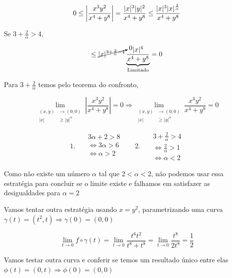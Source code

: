 \documentclass[
  letterpaper,
  DIV=11,
  numbers=noendperiod]{scrreprt}
\begin{document}
\[
0 \leq \left\lvert\frac{x^3y^2}{x^4+y^8} \right\rvert=
\frac{\lvert x \rvert^3 \lvert y \rvert^2}{x^4+y^8} \leq
\frac{\lvert x \rvert^{3} \lvert x \rvert^{\frac{2}{\alpha}}}{x^4+y^8} \\
\]

Se \(3 + \frac{2}{\alpha} > 4\),

\[
\leq \cancelto{0}{\lvert x \rvert^{3+\frac{2}{\alpha}-4}}
\underbrace{\frac{\lvert x \rvert^{4}}{x^4+y^8}}_{\text{Limitado}} = 0
\]

Para \(3 + \frac{2}{\alpha}\) temos pelo teorema do confronto,

\[
\lim_{\begin{aligned}(x,y)&\rightarrow (0,0) \\ 
\lvert x \rvert & \geq \lvert y \rvert^{\alpha} \end{aligned}}
\left\lvert \frac{x^3y^2}{x^4+y^8} \right\rvert = 0 \Rightarrow
\lim_{\begin{aligned}(x,y)&\rightarrow (0,0) \\ 
\lvert x \rvert & \geq \lvert y \rvert^{\alpha} \end{aligned}}
\frac{x^3y^2}{x^4+y^8} = 0
\]

\[
1. ~~~
\begin{aligned}
  &3\alpha + 2 > 8 \\
  &\Leftrightarrow 3\alpha > 6 \\
  &\Leftrightarrow \alpha > 2 \\
\end{aligned} ~~~~~~~~
2. ~~~
\begin{aligned}
  &3 + \frac{2}{\alpha} > 4 \\
  &\Leftrightarrow \frac{2}{\alpha} > 1 \\
  &\Leftrightarrow \alpha < 2
\end{aligned}
\]

Como não existe um número \(\alpha\) tal que \(2 < \alpha < 2\), não
podemos usar essa estratégia para concluir se o limite existe e falhamos
em satisfazer as desigualdades para \(\alpha = 2\)

Vamos tentar outra estratégia usando \(x = y^2\), parametrizando uma
curva \(\gamma(t)=(t^2,t) \Rightarrow \gamma(0) = (0,0)\)

\[
\lim_{t\rightarrow 0} f \circ \gamma (t) = \lim_{t\rightarrow 0}
\frac{t^6 t^2}{t^8 + t^8} = \lim_{t\rightarrow 0} \frac{t^8}{2t^8} = \frac{1}{2}
\]

Vamos testar outra curva e conferir se temos um resultado único entre
elas \(\phi(t) = (0,t) \Rightarrow \phi(0) = (0,0)\)
\end{document}
